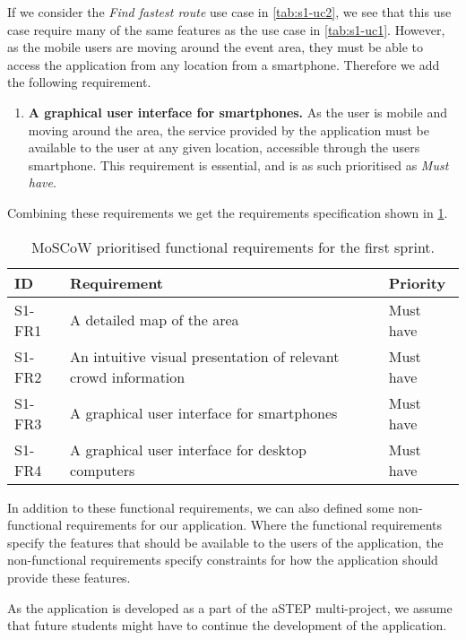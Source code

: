 If we consider the \emph{Find fastest route} use case in \cref{tab:s1-uc2}, we see that this use case require many of the same features as the use case in \cref{tab:s1-uc1}. However, as the mobile users are moving around the event area, they must be able to access the application from any location from a smartphone. Therefore we add the following requirement.

\begin{enumerate}[resume]
    \item \textbf{A graphical user interface for smartphones.} As the user is mobile and moving around the area, the service provided by the application must be available to the user at any given location, accessible through the users smartphone. This requirement is essential, and is as such prioritised as \emph{Must have}.

\end{enumerate}

Combining these requirements we get the requirements specification shown in \cref{tab:s1_req}.

\begin{table}[h!]
	\centering
	\begin{tabularx}{\textwidth}{lXl}
		\toprule
		\textbf{ID} & \textbf{Requirement} & \textbf{Priority} \\
		\midrule 
		\rowcolor[HTML]{EFEFEF} 
		S1-FR1 & A detailed map of the area & Must have \\
		S1-FR2 & An intuitive visual presentation of relevant crowd information & Must have \\
		\rowcolor[HTML]{EFEFEF} 
		S1-FR3 & A graphical user interface for smartphones & Must have \\
		S1-FR4 & A graphical user interface for desktop computers & Must have \\
		\bottomrule
	\end{tabularx}
	\caption{MoSCoW prioritised functional requirements for the first sprint.}
	\label{tab:s1_req}
\end{table}

In addition to these functional requirements, we can also defined some non-functional requirements for our application. Where the functional requirements specify the features that should be available to the users of the application, the non-functional requirements specify constraints for how the application should provide these features.

As the application is developed as a part of the aSTEP multi-project, we assume that future students might have to continue the development of the application.

